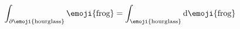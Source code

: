\documentclass[varwidth, margin=4pt]{standalone}
\begin{document}
  
$
  \displaystyle
    \int_{\partial\text{\emoji{hourglass}}} \text{\emoji{frog}}
  = \int_\text{\emoji{hourglass}} \mathrm{d}\text{\emoji{frog}}
$
\end{document}
